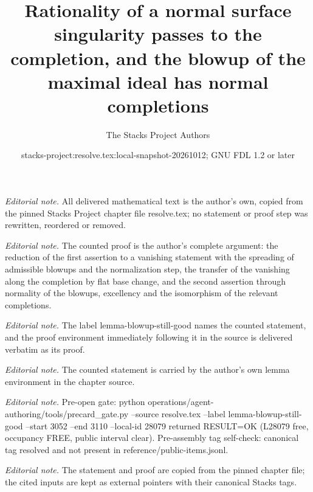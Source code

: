 \documentclass[10pt,a4paper]{amsart}
\title{Rationality of a normal surface singularity passes to the completion, and the blowup of the maximal ideal has normal completions}
\author{The Stacks Project Authors}
\date{stacks-project:resolve.tex:local-snapshot-20261012; GNU FDL 1.2 or later}
\theoremstyle{plain}
\theoremstyle{definition}
\theoremstyle{remark}
\numberwithin{equation}{subsection}
\begin{document}
\maketitle
\noindent\textit{Editorial note.} All delivered mathematical text is the author's own, copied from the pinned Stacks Project chapter file resolve.tex; no statement or proof step was rewritten, reordered or removed.\par\medskip
\noindent\textit{Editorial note.} The counted proof is the author's complete argument: the reduction of the first assertion to a vanishing statement with the spreading of admissible blowups and the normalization step, the transfer of the vanishing along the completion by flat base change, and the second assertion through normality of the blowups, excellency and the isomorphism of the relevant completions.\par\medskip
\noindent\textit{Editorial note.} The label lemma-blowup-still-good names the counted statement, and the proof environment immediately following it in the source is delivered verbatim as its proof.\par\medskip
\noindent\textit{Editorial note.} The counted statement is carried by the author's own lemma environment in the chapter source.\par\medskip
\noindent\textit{Editorial note.} Pre-open gate: python operations/agent-authoring/tools/precard\_gate.py --source resolve.tex --label lemma-blowup-still-good --start 3052 --end 3110 --local-id 28079 returned RESULT=OK (L28079 free, occupancy FREE, public interval clear). Pre-assembly tag self-check: canonical tag resolved and not present in reference/public-items.jsonl.\par\medskip
\noindent\textit{Editorial note.} The statement and proof are copied from the pinned chapter file; the cited inputs are kept as external pointers with their canonical Stacks tags.\par\medskip
\end{document}
